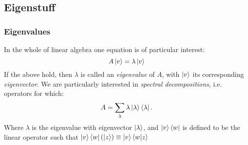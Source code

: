 \documentclass{beamer}
\begin{document}
\subsection{Eigenstuff}
\begin{frame}
    \frametitle{Eigenvalues}
    In the whole of linear algebra one equation is of particular interest:
    \begin{equation}
        A\ket{v} = \lambda \ket{v}
    \end{equation}
    If the above hold, then $\lambda$ is called an \textit{eigenvalue} of $A$, with $\ket{v}$ its corresponding \textit{eigenvector}.
    We are particularly interested in \textit{spectral decompositions}, i.e. operators for which:
    \begin{equation}
        A = \sum_\lambda \lambda \ket{\lambda}\bra{\lambda}.
    \end{equation}
    Where $\lambda$ is the eigenvalue with eigenvector $\ket{\lambda}$, and $\ket{v}\bra{w}$ is defined to
    be the linear operator such that $\ket{v}\bra{w}(\ket{z}) \equiv \ket{v}\braket{w|z}$

\end{frame}
\end{document}
